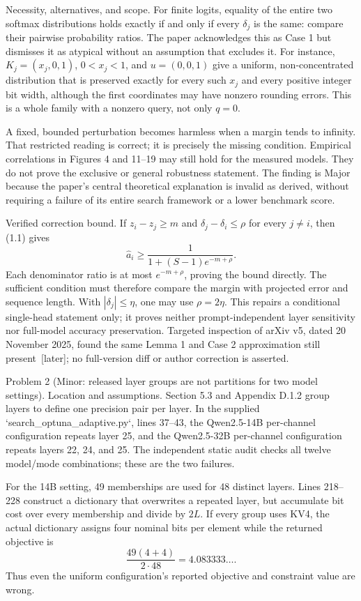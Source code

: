 \documentclass[10pt]{article}
\begin{document}
Necessity, alternatives, and scope. For finite logits, equality of the entire two softmax distributions holds exactly if and only if every \(\delta_j\) is the same: compare their pairwise probability ratios. The paper acknowledges this as Case 1 but dismisses it as atypical without an assumption that excludes it. For instance, \(K_j=(x_j,0,1)\), \(0<x_j<1\), and \(u=(0,0,1)\) give a uniform, non-concentrated distribution that is preserved exactly for every such \(x_j\) and every positive integer bit width, although the first coordinates may have nonzero rounding errors. This is a whole family with a nonzero query, not only \(q=0\).\par
A fixed, bounded perturbation becomes harmless when a margin tends to infinity. That restricted reading is correct; it is precisely the missing condition. Empirical correlations in Figures 4 and 11–19 may still hold for the measured models. They do not prove the exclusive or general robustness statement. The finding is Major because the paper’s central theoretical explanation is invalid as derived, without requiring a failure of its entire search framework or a lower benchmark score.\par
Verified correction bound. If \(z_i-z_j\ge m\) and \(\delta_j-\delta_i\le\rho\) for every \(j\ne i\), then (1.1) gives \[\widehat a_i\ge \frac{1}{1+(S-1)e^{-m+\rho}}. \tag{2.1}\] Each denominator ratio is at most \(e^{-m+\rho}\), proving the bound directly. The sufficient condition must therefore compare the margin with projected error and sequence length. With \(|\delta_j|\le\eta\), one may use \(\rho=2\eta\). This repairs a conditional single-head statement only; it proves neither prompt-independent layer sensitivity nor full-model accuracy preservation. Targeted inspection of arXiv v5, dated 20 November 2025, found the same Lemma 1 and Case 2 approximation still present [later]; no full-version diff or author correction is asserted.\par
Problem 2 (Minor: released layer groups are not partitions for two model settings).  Location and assumptions. Section 5.3 and Appendix D.1.2 group layers to define one precision pair per layer. In the supplied `search\_optuna\_adaptive.py`, lines 37–43, the Qwen2.5-14B per-channel configuration repeats layer 25, and the Qwen2.5-32B per-channel configuration repeats layers 22, 24, and 25. The independent static audit checks all twelve model/mode combinations; these are the two failures.\par
For the 14B setting, 49 memberships are used for 48 distinct layers. Lines 218–228 construct a dictionary that overwrites a repeated layer, but accumulate bit cost over every membership and divide by \(2L\). If every group uses KV4, the actual dictionary assigns four nominal bits per element while the returned objective is \[\frac{49(4+4)}{2\cdot48}=4.083333\ldots.\] Thus even the uniform configuration’s reported objective and constraint value are wrong.\par
\end{document}
